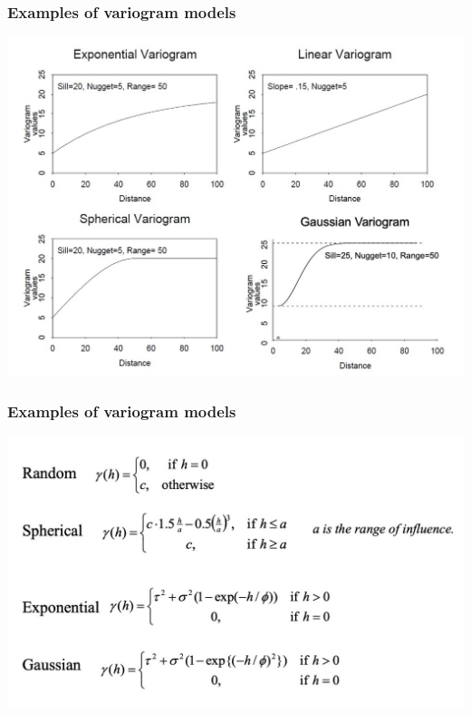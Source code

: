 \documentclass[parskip,12pt]{beamer}
\begin{document}
\begin{frame}
\frametitle{Examples of variogram models}
    \begin{center}
     \includegraphics[width=\textwidth]{VariogramModels}
          \end{center}
\end{frame}


\begin{frame}
\frametitle{Examples of variogram models}
    \begin{center}
     \includegraphics[width=\textwidth]{VariogramFormulae}
          \end{center}
\end{frame}
\end{document}
